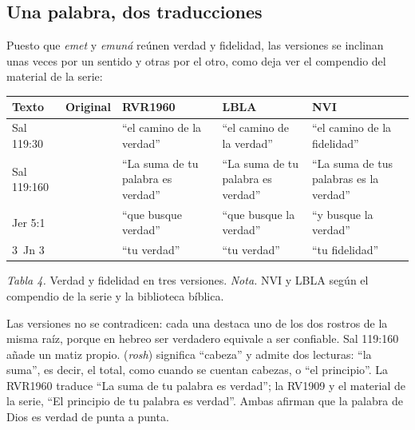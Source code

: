 
\subsection{Una palabra, dos traducciones}
Puesto que \emph{emet} y \emph{emuná} reúnen verdad y fidelidad, las versiones se inclinan unas veces por un sentido y otras por el otro, como deja ver el compendio del material de la serie:

\begin{center}\small\renewcommand{\arraystretch}{1.2}
\begin{tabular}{@{}L{1.8cm}L{2.4cm}L{3.3cm}L{3.2cm}L{3.4cm}@{}}
\toprule
\textbf{Texto} & \textbf{Original} & \textbf{RVR1960} & \textbf{LBLA} & \textbf{NVI} \\ \midrule
Sal 119:30 &  & ``el camino de la verdad'' & ``el camino de la verdad'' & ``el camino de la fidelidad'' \\
Sal 119:160 &  & ``La suma de tu palabra es verdad'' & ``La suma de tu palabra es verdad'' & ``La suma de tus palabras es la verdad'' \\
Jer 5:1 &  & ``que busque verdad'' & ``que busque la verdad'' & ``y busque la verdad'' \\
3~Jn 3 &  & ``tu verdad'' & ``tu verdad'' & ``tu fidelidad'' \\
\bottomrule
\end{tabular}\par
{\footnotesize\color{gris}\textit{Tabla 4.} Verdad y fidelidad en tres versiones. \textit{Nota.} NVI y LBLA según el compendio de la serie y la biblioteca bíblica.}
\end{center}

Las versiones no se contradicen: cada una destaca uno de los dos rostros de la misma raíz, porque en hebreo ser verdadero equivale a ser confiable. Sal 119:160 añade un matiz propio.  (\emph{rosh}) significa ``cabeza'' y admite dos lecturas: ``la suma'', es decir, el total, como cuando se cuentan cabezas, o ``el principio''. La RVR1960 traduce ``La suma de tu palabra es verdad''; la RV1909 y el material de la serie, ``El principio de tu palabra es verdad''. Ambas afirman que la palabra de Dios es verdad de punta a punta.

